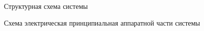 {
\setcounter{figure}{0}
\renewcommand{\thefigure}{\Asbuk{appendixNum}\arabic{figure}}

\newpage
\begin{figure}[H]
    \centering
    \caption{Структурная схема системы}
\end{figure}

\begin{figure}[H]
    \centering
    \caption{Схема электрическая принципиальная аппаратной части системы}
\end{figure}

}
